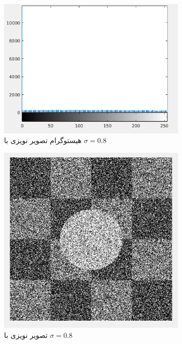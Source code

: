 \documentclass[11.5pt,a4paper]{article}
\begin{document}
\begin{figure}[h]
	\begin{subfigure}{.3\textwidth}
		\includegraphics[scale=0.2]{Imgs/NB_S8_Hist.png}
		\caption{هیستوگرام تصویر نویزی با $\sigma=0.8$}
	\end{subfigure}
	\begin{subfigure}{.3\textwidth}
		\includegraphics[scale=0.2]{Imgs/NB_S8_In.png}
		\caption{تصویر نویزی با $\sigma=0.8$}
	\end{subfigure}
	\begin{subfigure}{.3\textwidth}

\end{subfigure}
\end{figure}
\end{document}
